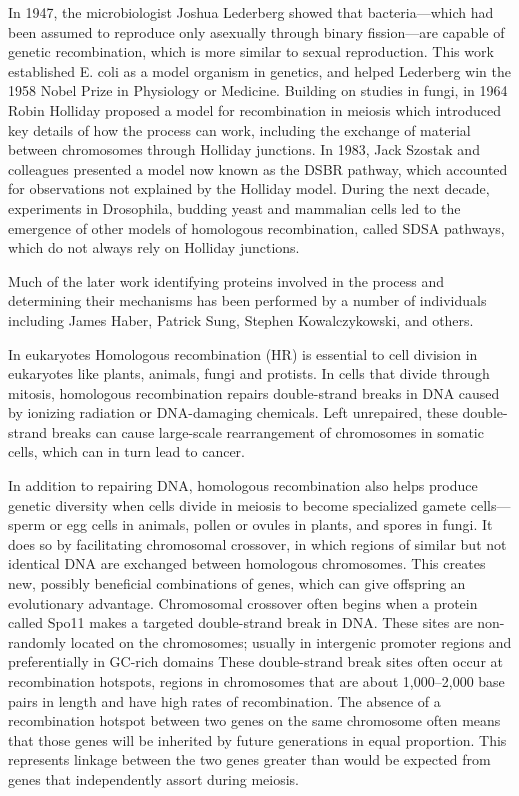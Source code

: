 In 1947, the microbiologist Joshua Lederberg showed that bacteria---which had been assumed to reproduce only asexually through binary fission---are capable of genetic recombination, which is more similar to sexual reproduction. This work established E. coli as a model organism in genetics, and helped Lederberg win the 1958 Nobel Prize in Physiology or Medicine. Building on studies in fungi, in 1964 Robin Holliday proposed a model for recombination in meiosis which introduced key details of how the process can work, including the exchange of material between chromosomes through Holliday junctions. In 1983, Jack Szostak and colleagues presented a model now known as the DSBR pathway, which accounted for observations not explained by the Holliday model. During the next decade, experiments in Drosophila, budding yeast and mammalian cells led to the emergence of other models of homologous recombination, called SDSA pathways, which do not always rely on Holliday junctions.

Much of the later work identifying proteins involved in the process and determining their mechanisms has been performed by a number of individuals including James Haber, Patrick Sung, Stephen Kowalczykowski, and others.

In eukaryotes
Homologous recombination (HR) is essential to cell division in eukaryotes like plants, animals, fungi and protists. In cells that divide through mitosis, homologous recombination repairs double-strand breaks in DNA caused by ionizing radiation or DNA-damaging chemicals. Left unrepaired, these double-strand breaks can cause large-scale rearrangement of chromosomes in somatic cells, which can in turn lead to cancer.

In addition to repairing DNA, homologous recombination also helps produce genetic diversity when cells divide in meiosis to become specialized gamete cells---sperm or egg cells in animals, pollen or ovules in plants, and spores in fungi. It does so by facilitating chromosomal crossover, in which regions of similar but not identical DNA are exchanged between homologous chromosomes. This creates new, possibly beneficial combinations of genes, which can give offspring an evolutionary advantage. Chromosomal crossover often begins when a protein called Spo11 makes a targeted double-strand break in DNA. These sites are non-randomly located on the chromosomes; usually in intergenic promoter regions and preferentially in GC-rich domains These double-strand break sites often occur at recombination hotspots, regions in chromosomes that are about 1,000--2,000 base pairs in length and have high rates of recombination. The absence of a recombination hotspot between two genes on the same chromosome often means that those genes will be inherited by future generations in equal proportion. This represents linkage between the two genes greater than would be expected from genes that independently assort during meiosis.

